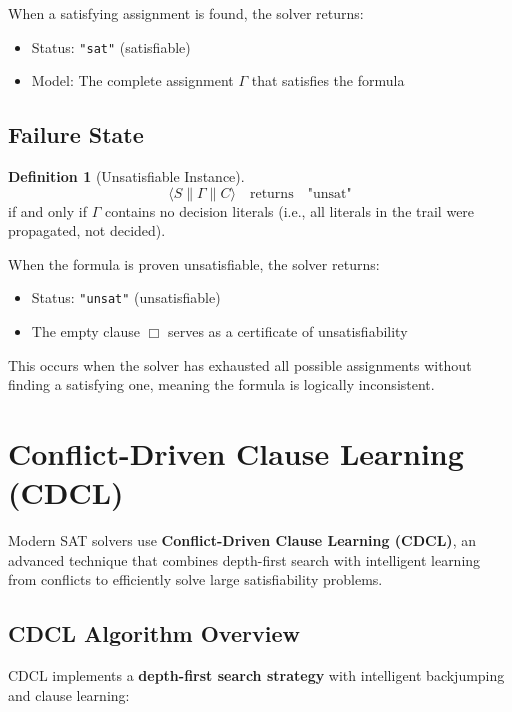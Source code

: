 \documentclass[11pt,a4paper]{article}
\theoremstyle{definition}
\newtheorem{definition}{Definition}[section]
\theoremstyle{plain}
\theoremstyle{remark}
\begin{document}
When a satisfying assignment is found, the solver returns:
\begin{itemize}
    \item Status: \texttt{"sat"} (satisfiable)
    \item Model: The complete assignment $\varGamma$ that satisfies the formula
\end{itemize}

\subsection{Failure State}

\begin{tcolorbox}[colback=red!5!white,colframe=red!75!black,title=\textbf{Failure Condition}]
\begin{definition}[Unsatisfiable Instance]
\[
\langle S \parallel \varGamma \parallel C \rangle \quad \text{returns} \quad \text{"unsat"}
\]
if and only if $\varGamma$ contains no decision literals (i.e., all literals in the trail were propagated, not decided).
\end{definition}
\end{tcolorbox}

When the formula is proven unsatisfiable, the solver returns:
\begin{itemize}
    \item Status: \texttt{"unsat"} (unsatisfiable)
    \item The empty clause $\Box$ serves as a certificate of unsatisfiability
\end{itemize}

This occurs when the solver has exhausted all possible assignments without finding a satisfying one, meaning the formula is logically inconsistent.

\section{Conflict-Driven Clause Learning (CDCL)}

Modern SAT solvers use \textbf{Conflict-Driven Clause Learning (CDCL)}, an advanced technique that combines depth-first search with intelligent learning from conflicts to efficiently solve large satisfiability problems.

\subsection{CDCL Algorithm Overview}

CDCL implements a \textbf{depth-first search strategy} with intelligent backjumping and clause learning:
\end{document}
